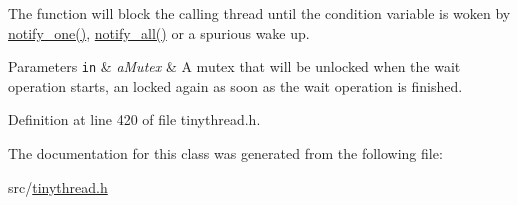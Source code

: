 The function will block the calling thread until the condition variable is woken by {\ttfamily \hyperlink{classtthread_1_1condition__variable_a1405d2957f6d7c4fdee5ec2d8ab16f40}{notify\+\_\+one()}}, {\ttfamily \hyperlink{classtthread_1_1condition__variable_a9a2b021ce582091de379a4e05de5cb31}{notify\+\_\+all()}} or a spurious wake up. 
\begin{DoxyParams}[1]{Parameters}
\mbox{\tt in}  & {\em a\+Mutex} & A mutex that will be unlocked when the wait operation starts, an locked again as soon as the wait operation is finished. \\
\hline
\end{DoxyParams}


Definition at line 420 of file tinythread.\+h.



The documentation for this class was generated from the following file\+:\begin{DoxyCompactItemize}
\item 
src/\hyperlink{tinythread_8h}{tinythread.\+h}\end{DoxyCompactItemize}
